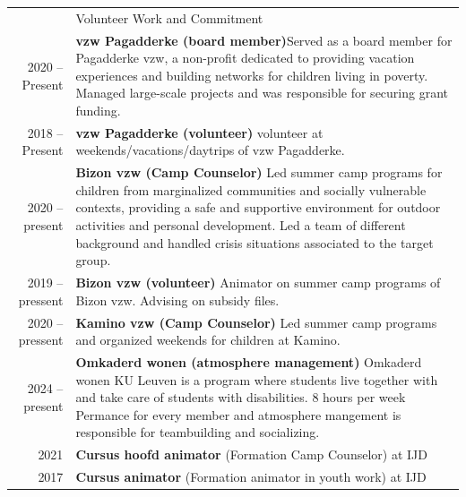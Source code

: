 \documentclass[letterpaper, 11pt]{article}
\newcommand{\headingfont}{\Large\color{OliveGreen}}
\newenvironment{SectionTable}[1]{
	\renewcommand*{\arraystretch}{1.7}
	\setlength{\tabcolsep}{10pt}
	\begin{longtable}{Rp{5.2in}} & #1 \\}
{\end{longtable}\vspace{-1.5cm}}
\begin{document}



\begin{SectionTable}{\headingfont Volunteer Work and Commitment}
2020 -- Present &
\textbf{vzw Pagadderke (board member)}\newline Served as a board member for Pagadderke vzw, a non-profit dedicated to providing vacation experiences and building networks for children living in poverty. Managed large-scale projects and was responsible for securing grant funding. \\
2018 -- Present &
\textbf{vzw Pagadderke (volunteer)}\newline
volunteer at weekends/vacations/daytrips of vzw Pagadderke.\\

2020 -- present &
\textbf{Bizon vzw (Camp Counselor)} \newline
 Led summer camp programs for children from marginalized communities and socially vulnerable contexts, providing a safe and supportive environment for outdoor activities and personal development. Led a team of different background and handled crisis situations associated to the target group. \\

 2019 -- pressent &
\textbf{Bizon vzw (volunteer)} \newline
 Animator on summer camp programs of Bizon vzw. Advising on subsidy files. \\
 
  2020 -- pressent &
\textbf{Kamino vzw (Camp Counselor)} \newline
 Led summer camp programs and organized weekends for children at Kamino. \\

 2024 -- present &
\textbf{Omkaderd wonen (atmosphere management)} \newline
 Omkaderd wonen KU Leuven is a program where students live together with and take care of students with disabilities. 8 hours per week Permance for every member and atmosphere mangement is responsible for teambuilding and socializing. \\


 2021 & \textbf{Cursus hoofd animator} (Formation Camp Counselor) at IJD \\
 
 2017 & \textbf{Cursus animator} (Formation  animator in youth work) at IJD\\
\end{SectionTable}
\end{document}
